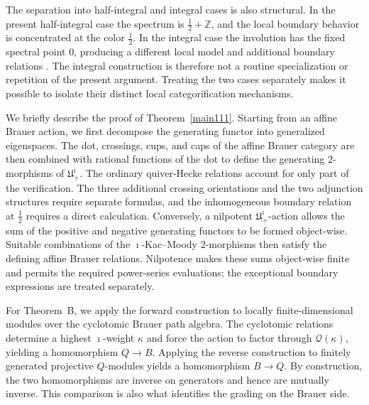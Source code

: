 \documentclass[a4,10pt]{amsart}
\numberwithin{equation}{section}
\theoremstyle{definition}
\begin{document}
The separation into half-integral and integral cases is also structural. In the present half-integral case the spectrum is $\frac12+\mathbb Z$, and the local boundary behavior is concentrated at the color $\frac12$. In the integral case the involution has the fixed spectral point $0$, producing a different local model and additional boundary relations \cite{GRSW}. The integral construction is therefore not a routine specialization or repetition of the present argument. Treating the two cases separately makes it possible to isolate their distinct local categorification mechanisms.



We briefly describe the proof of Theorem~\ref{main111}.  Starting from an affine Brauer action, we first decompose the generating functor into generalized eigenspaces. The dot, crossings, cups, and caps of the affine Brauer category are then combined with rational functions of the dot to define the generating $2$-morphisms of $\mathfrak U^{\imath}_{+}$. The ordinary quiver-Hecke relations account for only part of the verification. The three additional crossing orientations and the two adjunction structures require separate formulas, and the inhomogeneous boundary relation at $\frac12$ requires a direct calculation. Conversely, a nilpotent $\mathfrak  U^{\imath}_{+}$-action allows the sum of the positive and negative generating functors to be formed object-wise. Suitable combinations of the $\imath$-Kac--Moody $2$-morphisms then satisfy the defining affine Brauer relations. Nilpotence makes these sums object-wise finite and permits the
required power-series evaluations; the exceptional boundary
expressions are treated separately.



For Theorem~B, we apply the forward construction to locally finite-dimensional modules over the cyclotomic Brauer path algebra. The cyclotomic relations determine a highest $\imath$-weight $\kappa$ and force the action to factor through $\mathcal Q(\kappa)$, yielding a homomorphism $Q\to B$. Applying the reverse construction to finitely generated projective $Q$-modules yields a homomorphism $B\to Q$. By construction, the two homomorphisms 
are inverse on generators and hence are mutually inverse. 
 This comparison is also what identifies the grading on the Brauer side.
\end{document}
